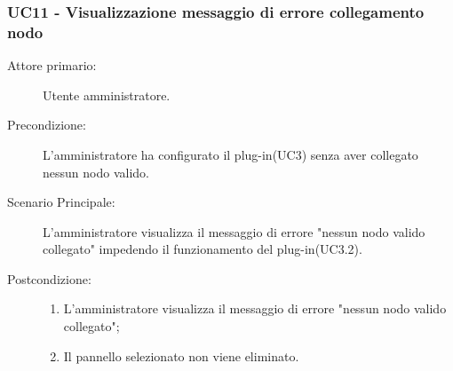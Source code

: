 \subsubsection{UC11 - Visualizzazione messaggio di errore collegamento nodo}
\label{sssec:uc11}
\begin{description}
	\item[Attore primario:] Utente amministratore.
	\item[Precondizione:] L'amministratore ha configurato il plug-in(UC3) senza aver collegato nessun nodo valido.
	\item[Scenario Principale:] L'amministratore visualizza il messaggio di errore "nessun nodo valido collegato" impedendo il funzionamento del plug-in(UC3.2).
	\item[Postcondizione:]
	\begin{enumerate}
		\item L'amministratore visualizza il messaggio di errore "nessun nodo valido collegato";
		\item Il pannello selezionato non viene eliminato.
	\end{enumerate}
\end{description}
